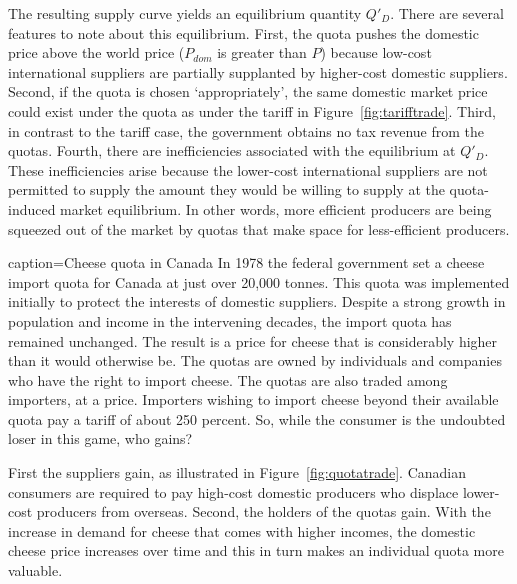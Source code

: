 

\newhtmlpage

The resulting supply curve yields an equilibrium quantity $Q'_{D}$. 
There are several features to note about this equilibrium. First, the
quota pushes the domestic price above the world price ($P_{dom}$ is greater
than $P$) because low-cost international suppliers are partially supplanted
by higher-cost domestic suppliers. Second, if the quota is chosen
`appropriately', the same domestic market price could exist under the quota
as under the tariff in Figure~\ref{fig:tarifftrade}. Third, in contrast to
the tariff case, the government obtains no tax revenue from the quotas.
Fourth, there are inefficiencies associated with the equilibrium at 
$Q'_{D}$. These inefficiencies arise because the lower-cost
international suppliers are not permitted to supply the amount they would be
willing to supply at the quota-induced market equilibrium. In other words,
more efficient producers are being squeezed out of the market by quotas that
make space for less-efficient producers. 

\begin{ApplicationBox}{caption={Cheese quota in Canada \label{app:ch15app3}}}
	In 1978 the federal government set a cheese import quota for Canada at just over 20,000 tonnes. This quota was implemented initially to protect the interests of domestic suppliers. Despite a strong growth in population and income in the intervening decades, the import quota has remained unchanged. The result is a price for cheese that is considerably higher than it would otherwise be. The quotas are owned by individuals and companies who have the right to import cheese. The quotas are also traded among importers, at a price. Importers wishing to import cheese beyond their available quota pay a tariff of about 250 percent. So, while the consumer is the undoubted loser in this game, who gains?

	First the suppliers gain, as illustrated in Figure~\ref{fig:quotatrade}. Canadian consumers are required to pay high-cost domestic producers who displace lower-cost producers from overseas. Second, the holders of the quotas gain. With the increase in demand for cheese that comes with higher incomes, the domestic cheese price increases over time and this in turn makes an individual quota more valuable.
\end{ApplicationBox}
